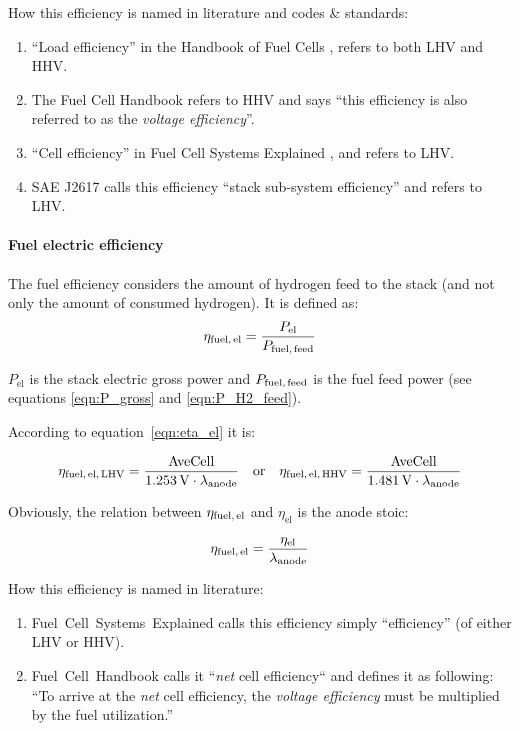 \documentclass[11pt,a4paper,english,twoside]{scrreprt}
\begin{document}
How this efficiency is named in literature and codes \& standards:

\begin{enumerate}
\item  ``Load efficiency'' in the Handbook of Fuel Cells \cite {HFC}, refers to both LHV and HHV.

\item  The Fuel Cell Handbook \cite{FCHB} refers to HHV and says ``this efficiency is also referred to as the \textit{voltage efficiency}''.

\item  ``Cell efficiency'' in Fuel Cell Systems Explained \cite{FCSE}, and refers to LHV.

\item  SAE J2617 \cite{SAEJ2617} calls this efficiency ``stack sub-system efficiency'' and refers to LHV.
\end{enumerate}


\paragraph{Fuel electric efficiency}

The fuel efficiency considers the amount of hydrogen feed to the stack (and not only the amount of consumed hydrogen). It is defined as:
\[
	\eta _{\text{fuel,\,el}} =\frac{P_{\text{el}}}{P_{\text{fuel,\,feed}}} 
\]

$P_{\text{el}}$ is the stack electric gross power and $P_{\text{fuel,\,feed}}$ is the fuel feed power (see equations \ref{eqn:P_gross} and \ref{eqn:P_H2_feed}).

According to equation~\ref{eqn:eta_el} it is:

\[
  \eta _{\text{fuel,\,el,\,LHV}} = \frac{\text{AveCell}}{\SI{1.253}{\volt} \cdot \lambda_{\text{anode}}} \quad \mbox{or} \quad
  \eta _{\text{fuel,\,el,\,HHV}} = \frac{\text{AveCell}}{\SI{1.481}{\volt} \cdot \lambda_{\text{anode}}}
\]

Obviously, the relation between $\eta_{\text{fuel,\,el}}$ and $\eta_{\text{el}}$ is the anode stoic:

\[
	\eta_{\text{fuel,\,el}} = \frac{\eta_{\text{el}}}{\lambda_{\text{anode}}}
\]


How this efficiency is named in literature:

\begin{enumerate}
\item  Fuel~Cell~Systems~Explained \cite{FCSE} calls this efficiency simply ``efficiency'' (of either LHV or HHV).

\item  Fuel~Cell~Handbook \cite{FCHB} calls it ``\textit{net} cell efficiency`` and defines it as following: ``To arrive at the \textit{net} cell efficiency, the \textit{voltage efficiency} must be multiplied by the fuel utilization.''
\end{enumerate}
\end{document}
